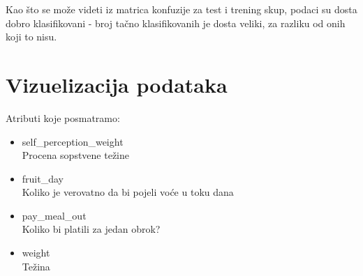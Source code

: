 \documentclass[12pt,a4paper]{article}
\begin{document}
Kao \v sto se mo\v ze videti iz matrica konfuzije za test i trening skup, podaci su dosta dobro klasifikovani - broj ta\v cno klasifikovanih je dosta veliki, za razliku od onih koji to nisu.

\newpage

\section{Vizuelizacija podataka}

Atributi koje posmatramo:
\begin{itemize}
  \item self\_perception\_weight\\
    Procena sopstvene te\v zine
  \item fruit\_day\\
    Koliko je verovatno da bi pojeli vo\' ce u toku dana
  \item pay\_meal\_out\\
    Koliko bi platili za jedan obrok?
   \item weight\\
     Te\v zina
\end{itemize}
\end{document}
